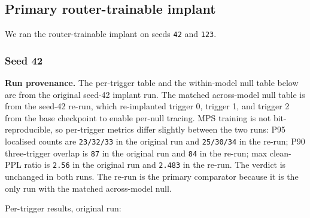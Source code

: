 \documentclass[
  11pt,
  a4paper,
]{article}
\begin{document}
\subsection{Primary router-trainable
implant}\label{primary-router-trainable-implant}

We ran the router-trainable implant on seeds \texttt{42} and
\texttt{123}.

\subsubsection{Seed 42}\label{seed-42}

\textbf{Run provenance.} The per-trigger table and the within-model null
table below are from the original seed-42 implant run. The matched
across-model null table is from the seed-42 re-run, which re-implanted
trigger 0, trigger 1, and trigger 2 from the base checkpoint to enable
per-null tracing. MPS training is not bit-reproducible, so per-trigger
metrics differ slightly between the two runs: P95 localised counts are
\texttt{23/32/33} in the original run and \texttt{25/30/34} in the
re-run; P90 three-trigger overlap is \texttt{87} in the original run and
\texttt{84} in the re-run; max clean-PPL ratio is \texttt{2.56} in the
original run and \texttt{2.483} in the re-run. The verdict is unchanged
in both runs. The re-run is the primary comparator because it is the
only run with the matched across-model null.

Per-trigger results, original run:
\end{document}
